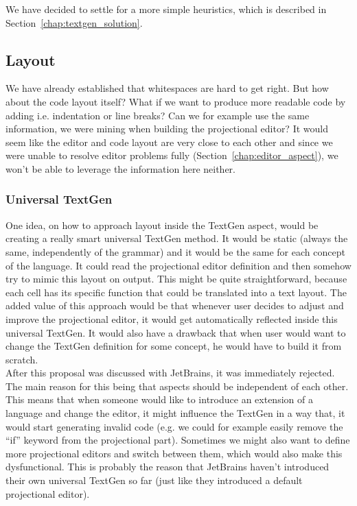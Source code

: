 We have decided to settle for a more simple heuristics, which is described in Section~\ref{chap:textgen_solution}.

\subsection{Layout}

We have already established that whitespaces are hard to get right.
But how about the code layout itself?
What if we want to produce more readable code by adding i.e. indentation or line breaks?
Can we for example use the same information, we were mining when building the projectional editor?
It would seem like the editor and code layout are very close to each other and since we were unable to resolve editor problems fully (Section~\ref{chap:editor_aspect}), we won't be able to leverage the information here neither.

\subsubsection{Universal TextGen}
One idea, on how to approach layout inside the TextGen aspect, would be creating a really smart universal TextGen method.
It would be static (always the same, independently of the grammar) and it would be the same for each concept of the language.
It could read the projectional editor definition and then somehow try to mimic this layout on output.
This might be quite straightforward, because each cell has its specific function that could be translated into a text layout.
The added value of this approach would be that whenever user decides to adjust and improve the projectional editor, it would get automatically reflected inside this universal TextGen.
It would also have a drawback that when user would want to change the TextGen definition for some concept, he would have to build it from scratch.
\\

After this proposal was discussed with JetBrains, it was immediately rejected.
The main reason for this being that aspects should be independent of each other.
This means that when someone would like to introduce an extension of a language and change the editor, it might influence the TextGen in a way that, it would start generating invalid code (e.g. we could for example easily remove the “if” keyword from the projectional part).
Sometimes we might also want to define more projectional editors and switch between them, which would also make this dysfunctional.
This is probably the reason that JetBrains haven't introduced their own universal TextGen so far (just like they introduced a default projectional editor).

